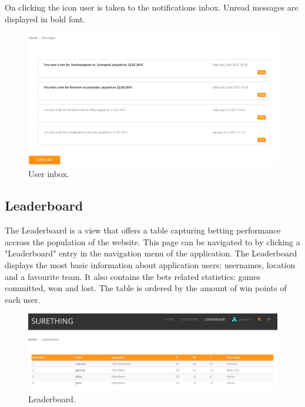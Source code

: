 On clicking the icon user is taken to the notifications inbox. Unread messages are displayed in bold font.

\begin{figure}[H]
	\begin{center}
		\includegraphics[width=.90\linewidth,natwidth=610,natheight=642]{impl/images/inbox}
		\caption{User inbox.} \label{fig:using: inbox}
	\end{center}
\end{figure}

\subsection{Leaderboard}
\label{subsec:leaderboard}
The Leaderboard is a view that offers a table capturing betting performance accross the population of the website. This page can be navigated to by clicking a "Leaderboard" entry in the navigation menu of the application. The Leaderboard displays the most basic information about application users: usernames, location and a favourite team. It also contains the bets related statistics: games committed, won and lost. The table is ordered by the amount of win points of each user.

\begin{figure}[H]
	\begin{center}
		\includegraphics[width=.90\linewidth,natwidth=610,natheight=642]{impl/images/leaderboard}
		\caption{Leaderboard.} \label{fig:using: leaderboard}
	\end{center}
\end{figure}


